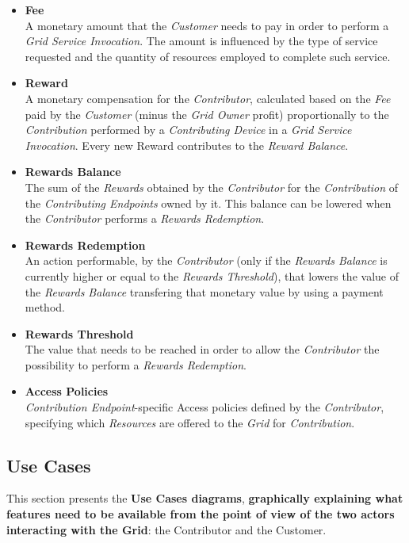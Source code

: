 \begin{itemize}
    \item \textbf{Fee}\label{fee}\\
    A monetary amount that the \textit{Customer} needs to pay in order to perform a \textit{Grid Service Invocation}. The amount is influenced by the type of service requested and the quantity of resources employed to complete such service.
    \item \textbf{Reward}\label{reward}\\
    A monetary compensation for the \textit{Contributor}, calculated based on the \textit{Fee} paid by the \textit{Customer} (minus the \textit{Grid Owner} profit) proportionally to the \textit{Contribution} performed by a \textit{Contributing Device} in a \textit{Grid Service Invocation}. Every new Reward contributes to the \textit{Reward Balance}.
    \item \textbf{Rewards Balance}\label{rewards_balance}\\
    The sum of the \textit{Rewards} obtained by the \textit{Contributor} for the \textit{Contribution} of the \textit{Contributing Endpoints} owned by it. This balance can be lowered when the \textit{Contributor} performs a \textit{Rewards Redemption}. 
    \item \textbf{Rewards Redemption}\label{rewards_redemption}\\
    An action performable, by the \textit{Contributor} (only if the \textit{Rewards Balance} is currently higher or equal to the \textit{Rewards Threshold}), that lowers the value of the \textit{Rewards Balance} transfering that monetary value by using a payment method.
    \item \textbf{Rewards Threshold}\label{rewards_threshold}\\
    The value that needs to be reached in order to allow the \textit{Contributor} the possibility to perform a \textit{Rewards Redemption}.
    \item \textbf{Access Policies}\label{access_policies}\\
    \textit{Contribution Endpoint}-specific Access policies defined by the \textit{Contributor}, specifying which \textit{Resources} are offered to the \textit{Grid} for \textit{Contribution}.
\end{itemize}

\subsection{Use Cases}\label{use_cases}
This section presents the \textbf{Use Cases diagrams}, \textbf{graphically explaining what features need to be available from the point of view of the two actors interacting with the Grid}: the Contributor and the Customer.

